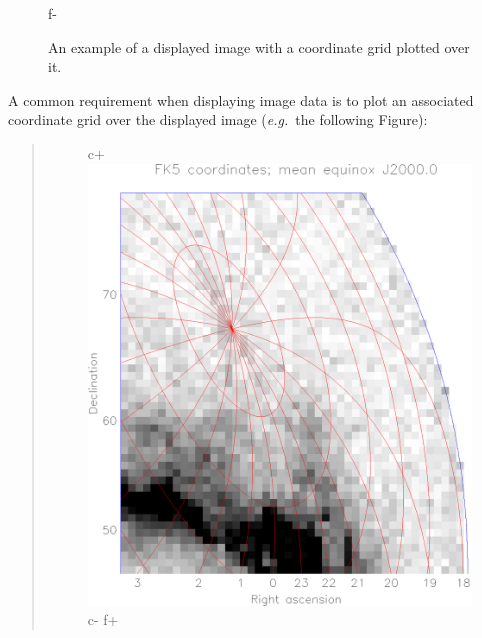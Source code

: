 \documentclass[twoside,11pt]{article}
\newenvironment{latexonly}{}{}
\begin{document}
\begin{latexonly}
\begin{figure}
\begin{center}
f-
   \caption{An example of a displayed image with a coordinate grid
   plotted over it.}
   \label{fig:overgrid}
   \end{center}
   \end{figure}
\end{latexonly}
\begin{htmlonly}
   A common requirement when displaying image data is to plot an
   associated coordinate grid over the displayed image ({\em{e.g.}}\
   the following Figure):
   \begin{quote}
   \begin{figure}[bhtp]
   \label{fig:overgrid}
c+
   \includegraphics[scale=0.8]{sun211_figures/overgrid.eps}
c-
f+

\end{figure}
\end{quote}
\end{htmlonly}
\end{document}
